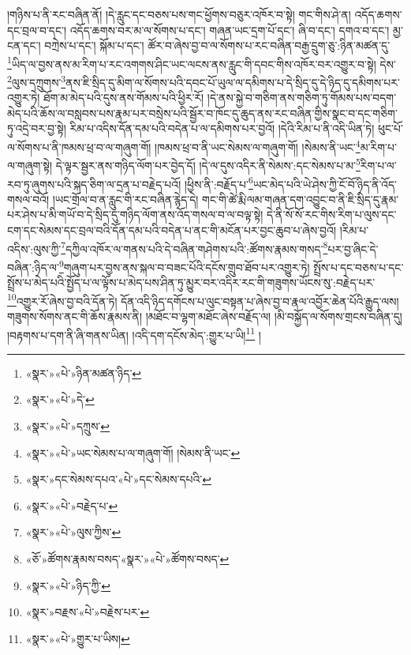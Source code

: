 །གཉིས་པ་ནི་རང་བཞིན་ནོ། །དེ་རླུང་དང་བཅས་པས་གང་ཕྱོགས་བཅུར་འཁོར་བ་སྟེ། གང་གིས་ཤེ་ན། འདོད་ཆགས་དང་བྲལ་བ་དང་། འདོད་ཆགས་བར་མ་ལ་སོགས་པ་དང་། གཞན་ཡང་དྲག་པོ་དང་། ཞི་བ་དང་། དགའ་བ་དང་། མྱ་ངན་དང་། བཀྲེས་པ་དང་། སྐོམ་པ་དང་། ཚོར་བ་ཞེས་བྱ་བ་ལ་སོགས་པ་རང་བཞིན་བརྒྱ་དྲུག་ཅུ་:ཉིན་མཚན་དུ་\footnote{«སྣར་»«པེ་»ཉིན་མཚན་ཉིད་}ཡིད་ལ་བྱས་ནས་མ་རིག་པ་རང་འགགས་ཤིང་ཡང་ལངས་ནས་རླུང་གི་དབང་གིས་འཁོར་བར་འགྱུར་བ་སྟེ། དེས་\footnote{«སྣར་»«པེ་»དེ་}ལུས་དཀྲུགས་\footnote{«སྣར་»«པེ་»དཀྲུས་}ནས་ཇི་སྲིད་དུ་མིག་ལ་སོགས་པའི་དབང་པོ་ཡུལ་ལ་དམིགས་པ་དེ་སྲིད་དུ་དེ་ཉིད་དུ་དམིགས་པར་འགྱུར་ཏེ། ཐོག་མ་མེད་པའི་དུས་ནས་གོམས་པའི་ཕྱིར་རོ། །དེ་ནས་སྐྱེ་བ་གཅིག་ནས་གཅིག་ཏུ་གོམས་པས་བདག་མེད་པའི་ཆོས་ལ་བསླབས་པས་རྣམ་པར་བསྲེས་པའི་སྦྱོར་བ་ཁོང་དུ་ཆུད་ནས་རང་བཞིན་གྱིས་སྣང་བ་དང་གཅིག་ཏུ་འདྲེ་བར་བྱ་སྟེ། རིམ་པ་འདིས་དོན་དམ་པའི་བདེན་པ་ལ་དམིགས་པར་བྱའོ། །དེའི་རིམ་པ་ནི་འདི་ཡིན་ཏེ། ཕུང་པོ་ལ་སོགས་པ་ནི་ཁམས་ཕྲ་བ་ལ་གཞུག་གོ། །ཁམས་ཕྲ་བ་ནི་ཡང་སེམས་ལ་གཞུག་གོ། །སེམས་ནི་ཡང་\footnote{«སྣར་»«པེ་»ཡང་སེམས་པ་ལ་གཞུག་གོ། །སེམས་ནི་ཡང་}མ་རིག་པ་ལ་གཞུག་སྟེ། དེ་ལྟར་སྦྱར་ནས་གཉིད་ལོག་པར་བྱེད་དོ། །དེ་ལ་དུས་འདིར་ནི་སེམས་:དང་སེམས་པ་མ་\footnote{«སྣར་»དང་སེམས་དཔའ་«པེ་»དང་སེམས་དཔའི་}རིག་པ་ལ་རབ་ཏུ་ཞུགས་པའི་སྐད་ཅིག་ལ་དྲན་པ་བརྗེད་པའོ། །ཕྱིས་ནི་:བརྗོད་པ་\footnote{«སྣར་»«པེ་»བརྗེད་པ་}ཡང་མེད་པའི་ཡེ་ཤེས་ཀྱི་ངོ་བོ་ཉིད་ནི་འོད་གསལ་བའོ། །ཡང་གྲོལ་བ་ན་རླུང་གི་རང་བཞིན་རྙེད་དེ། གང་གི་ཚེ་རྨི་ལམ་གཞན་དག་འབྱུང་བ་ནི་ཇི་སྲིད་དུ་རྣམ་པར་ཤེས་པ་མི་གཡོ་བ་དེ་སྲིད་དུ་གཉིད་ལོག་ནས་འོད་གསལ་བ་ལ་བལྟ་སྟེ། དེ་ནི་སོ་སོ་རང་གིས་རིག་པ་ལུས་དང་ངག་དང་སེམས་དང་བྲལ་བའི་དོན་དམ་པའི་བདེན་པ་ནང་གི་མངོན་པར་བྱང་ཆུབ་པ་ཞེས་བྱའོ། །རིམ་པ་འདིས་:ལུས་ཀྱི་\footnote{«སྣར་»«པེ་»ལུས་ཀྱིས་}དཀྱིལ་འཁོར་ལ་གནས་པའི་དེ་བཞིན་གཤེགས་པའི་:ཚོགས་རྣམས་གསད་\footnote{«ཅོ་»ཚོགས་རྣམས་བསད་«སྣར་»«པེ་»ཚོགས་བསད་}པར་བྱ་ཞིང་དེ་བཞིན་:ཉིད་ལ་\footnote{«སྣར་»«པེ་»ཉིད་ཀྱི་}གཞུག་པར་བྱས་ནས་སྐལ་བ་བཟང་པོའི་དངོས་གྲུབ་ཐོབ་པར་འགྱུར་ཏེ། སྤྲོས་པ་དང་བཅས་པ་དང་སྤྲོས་པ་མེད་པའི་སྤྱོད་པ་ལ་ལྟོས་པ་མེད་པས་ཤིན་ཏུ་མྱུར་བར་འདིར་རང་གི་གཟུགས་ཡོངས་སུ་:བརྗེད་པར་\footnote{«སྣར་»བརྗས་«པེ་»བརྗེས་པར་}འགྱུར་རོ་ཞེས་བྱ་བའི་དོན་ཏེ། དོན་འདི་ཉིད་དགོངས་པ་ལུང་བསྟན་པ་ཞེས་བྱ་བ་རྣལ་འབྱོར་ཆེན་པོའི་རྒྱུད་ལས། གཟུགས་སོགས་ནང་གི་ཆོས་རྣམས་ནི། །མཐོང་བ་ལྷག་མཐོང་ཞེས་བརྗོད་ལ། །མི་བསྐྱོད་ལ་སོགས་གྲངས་བཞིན་དུ། །བརྟགས་པ་དག་ནི་ཞི་གནས་ཡིན། །འདི་དག་དངོས་མེད་:གྱུར་པ་ཡི།\footnote{«སྣར་»«པེ་»གྱུར་པ་ཡིས།} །
